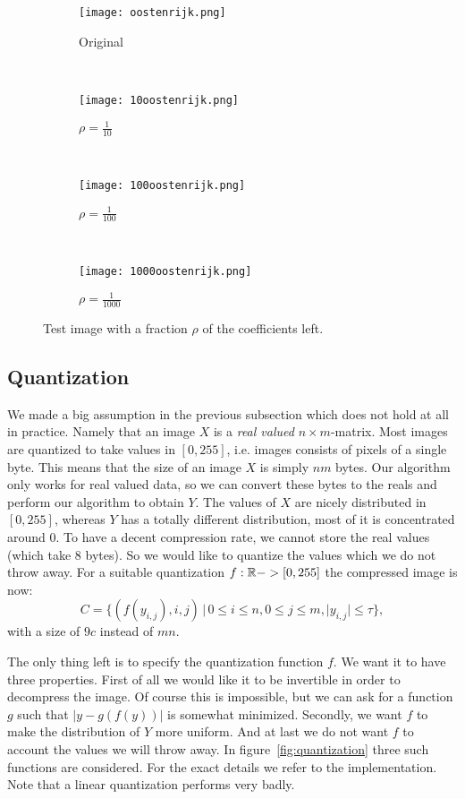 \begin{figure}
	\begin{subfigure}[b]{0.25\textwidth}
		\centering
		\texttt{[image: oostenrijk.png]}
		\caption{Original}
	\end{subfigure}~
	\begin{subfigure}[b]{0.25\textwidth}
		\centering
		\texttt{[image: 10oostenrijk.png]}
		\caption{$\rho=\frac{1}{10}$}
	\end{subfigure}~
	\begin{subfigure}[b]{0.25\textwidth}
		\centering
		\texttt{[image: 100oostenrijk.png]}
		\caption{$\rho=\frac{1}{100}$}
	\end{subfigure}~
	\begin{subfigure}[b]{0.25\textwidth}
		\centering
		\texttt{[image: 1000oostenrijk.png]}
		\caption{$\rho=\frac{1}{1000}$}
	\end{subfigure}
	\caption{Test image with a fraction $\rho$ of the coefficients left.}
	\label{fig:compression}
\end{figure}


\subsection{Quantization}
We made a big assumption in the previous subsection which does not hold at all in practice. Namely that an image $X$ is a \emph{real valued} $n \times m$-matrix. Most images are quantized to take values in $[0, 255]$, i.e. images consists of pixels of a single byte. This means that the size of an image $X$ is simply $nm$ bytes. Our algorithm only works for real valued data, so we can convert these bytes to the reals and perform our algorithm to obtain $Y$. The values of $X$ are nicely distributed in $[0, 255]$, whereas $Y$ has a totally different distribution, most of it is concentrated around 0. To have a decent compression rate, we cannot store the real values (which take 8 bytes). So we would like to quantize the values which we do not throw away. For a suitable quantization $f: \mathbb{R} -> [0, 255]$ the compressed image is now:
\[ C = \{ (f(y_{i,j}), i, j) \,|\, 0 \leq i \leq n, 0 \leq j \leq m, |y_{i,j}| \leq \tau \}, \]
with a size of $9c$ instead of $mn$.

The only thing left is to specify the quantization function $f$. We want it to have three properties. First of all we would like it to be invertible in order to decompress the image. Of course this is impossible, but we can ask for a function $g$ such that $|y - g(f(y))|$ is somewhat minimized. Secondly, we want $f$ to make the distribution of $Y$ more uniform. And at last we do not want $f$ to account the values we will throw away. In figure~\ref{fig:quantization} three such functions are considered. For the exact details we refer to the implementation. Note that a linear quantization performs very badly.

